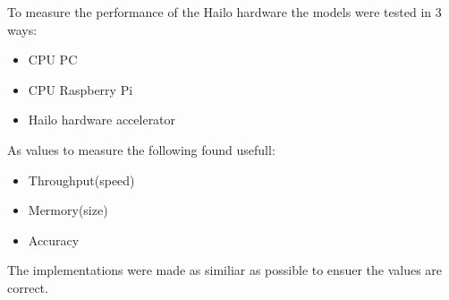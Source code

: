 To measure the performance of the Hailo hardware the models were tested in 3 ways:
\begin{itemize}
    \item CPU PC
    \item CPU Raspberry Pi
    \item Hailo hardware accelerator
\end{itemize}

As values to measure the following found usefull:
\begin{itemize}
    \item Throughput(speed)
    \item Mermory(size)
    \item Accuracy
\end{itemize}
The implementations were made as similiar as possible to ensuer the values are correct. 













